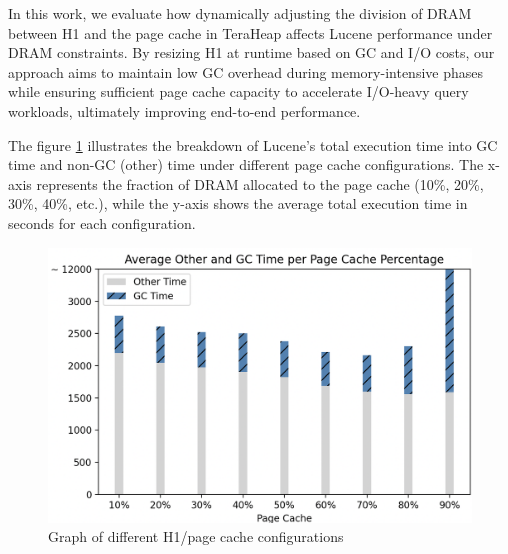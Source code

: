 In this work, we evaluate how dynamically adjusting the division of DRAM between H1 and the page cache in TeraHeap affects Lucene 
performance under DRAM constraints. By resizing H1 at runtime based on GC and I/O costs, our approach aims to maintain low GC overhead
during memory-intensive phases while ensuring sufficient page cache capacity to accelerate I/O-heavy query workloads, ultimately improving
end-to-end performance.

The figure \ref{fig:graph} illustrates the breakdown of Lucene’s total execution
time into GC time and non-GC (other) time under different page cache
configurations. The x-axis represents the fraction of DRAM allocated to the page
cache (10\%, 20\%, 30\%, 40\%, etc.), while the y-axis shows the average total
execution time in seconds for each configuration.

\begin{figure}[htbp]
  \centering
  \includegraphics[width=1\columnwidth]{fig/numbers.png}
  \caption{Graph of different H1/page cache configurations}
  \label{fig:graph}
\end{figure}

